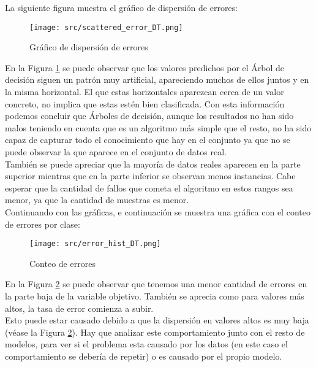 \pagebreak
La siguiente figura muestra el gráfico de dispersión de errores:
\begin{figure}[H]
	\centering
	\texttt{[image: src/scattered\_error\_DT.png]}
	\caption{Gráfico de dispersión de errores}
	\label{fig:tree_scattered}
\end{figure}
En la Figura \ref{fig:tree_scattered} se puede observar que los valores predichos por el Árbol de decisión siguen un patrón muy artificial, apareciendo muchos de ellos juntos y en la misma horizontal. El que estas horizontales aparezcan cerca de un valor concreto, no implica que estas estén bien clasificada.
Con esta información podemos concluir que Árboles de decisión, aunque los resultados no han sido malos teniendo en cuenta que es un algoritmo más simple que el resto, no ha sido capaz de capturar todo el conocimiento que hay en el conjunto ya que no se puede observar la  que aparece en el conjunto de datos real.\\
También se puede apreciar que la mayoría de datos reales aparecen en la parte superior mientras que en la parte inferior se observan menos instancias. Cabe esperar que la cantidad de fallos que cometa el algoritmo en estos rangos sea menor, ya que la cantidad de muestras es menor.\\
\linebreak
Continuando con las gráficas, e continuación se muestra una gráfica con el conteo de errores por clase:
\begin{figure}[H]
	\centering
	\texttt{[image: src/error\_hist\_DT.png]}
	\caption{Conteo de errores}
	\label{fig:tree_error_plot}
\end{figure}
En la Figura \ref{fig:tree_error_plot} se puede observar que tenemos una menor cantidad de errores en la parte baja de la variable objetivo. También se aprecia como para valores más altos, la tasa de error comienza a subir. \\Esto puede estar causado debido a que la dispersión en valores altos es muy baja (véase la Figura \ref{fig:tree_error_plot}). 
Hay que analizar este comportamiento junto con el resto de modelos, para ver si el problema esta causado por los datos (en este caso el comportamiento se debería de repetir) o es causado por el propio modelo.
